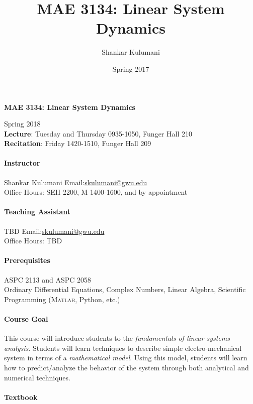 \documentclass[11pt, reqno]{article}   	%
\title{MAE 3134: Linear System Dynamics}
\author{Shankar Kulumani}
\date{Spring 2017}							%
\begin{document}
{\noindent\Large \textbf{MAE 3134: Linear System Dynamics}}

Spring 2018\\
\textbf{Lecture}: Tuesday and Thursday 0935-1050, Funger Hall 210\\
\textbf{Recitation}: Friday 1420-1510, Funger Hall 209
\paragraph{Instructor}
\begin{minipage}[t]{0.8\textwidth}
Shankar Kulumani \quad Email:\href{mailto:skulumani@gwu.edu}{skulumani@gwu.edu}\\
Office Hours: SEH 2200, M 1400-1600, and by appointment
\end{minipage}

\paragraph{Teaching Assistant}
\begin{minipage}[t]{0.8\textwidth}
TBD \quad Email:\href{mailto:skulumani@gwu.edu}{skulumani@gwu.edu}\\
Office Hours: TBD
\end{minipage}

\paragraph{Prerequisites}
\begin{minipage}[t]{0.8\textwidth}
ASPC 2113 and ASPC 2058\\
Ordinary Differential Equations, Complex Numbers, Linear Algebra, Scientific Programming (\textsc{Matlab}, Python, etc.)
\end{minipage}

\paragraph{Course Goal} 
This course will introduce students to the \textit{fundamentals of linear systems analysis}.
Students will learn techniques to describe simple electro-mechanical system in terms of a \textit{mathematical model}.
Using this model, students will learn how to predict/analyze the behavior of the system through both analytical and numerical techniques.

\paragraph{Textbook}
\end{document}
